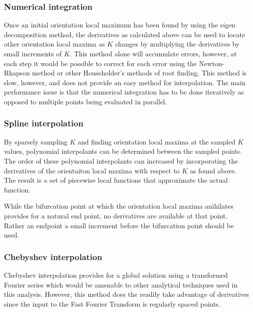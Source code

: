 \documentclass[11pt]{article} %
\begin{document}
\subsubsection{Numerical integration}

Once an initial orientation local maximum has been found by using the eigen decomposition method, the derivatives as calculated above can be used to locate other orientation local maxima as $ K $ changes by multiplying the derivatives by small increments of $ K $. This method alone will accumulate errors, however, at each step it would be possible to correct for each error using the Newton-Rhapson method or other Householder's methods of root finding. This method is slow, however, and does not provide an easy method for interpolation. The main performance issue is that the numerical integration has to be done iteratively as opposed to multiple points being evaluated in parallel.

\subsubsection{Spline interpolation}

By sparsely sampling $ K $ and finding orientation local maxima at the sampled $ K $ values, polynomial interpolants can be determined between the sampled points. The order of these polynomial interpolants can increased by incorporating the derivatives of the orientaiton local maxima with respect to $ K $ as found above. The result is a set of piecewise local functions that approximate the actual function.

While the bifurcation point at which the orientation local maxima anihilates provides for a natural end point, no derivatives are available at that point. Rather an endpoint a small increment before the bifurcation point should be used.

\subsubsection{Chebyshev interpolation}

Chebyshev interpolation provides for a global solution using a transformed Fourier series which would be amenable to other analytical techniques used in this analysis. However, this method does the readily take advantage of derivatives since the input to the Fast Fourier Transform is regularly spaced points.
\end{document}
